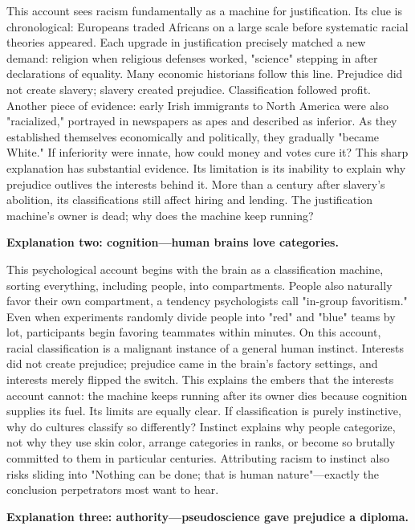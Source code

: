 This account sees racism fundamentally as a machine for justification. Its clue is chronological: Europeans traded Africans on a large scale before systematic racial theories appeared. Each upgrade in justification precisely matched a new demand: religion when religious defenses worked, "science" stepping in after declarations of equality. Many economic historians follow this line. Prejudice did not create slavery; slavery created prejudice. Classification followed profit. Another piece of evidence: early Irish immigrants to North America were also "racialized," portrayed in newspapers as apes and described as inferior. As they established themselves economically and politically, they gradually "became White." If inferiority were innate, how could money and votes cure it? This sharp explanation has substantial evidence. Its limitation is its inability to explain why prejudice outlives the interests behind it. More than a century after slavery's abolition, its classifications still affect hiring and lending. The justification machine's owner is dead; why does the machine keep running?

\textbf{Explanation two: cognition---human brains love categories.}

This psychological account begins with the brain as a classification machine, sorting everything, including people, into compartments. People also naturally favor their own compartment, a tendency psychologists call "in-group favoritism." Even when experiments randomly divide people into "red" and "blue" teams by lot, participants begin favoring teammates within minutes. On this account, racial classification is a malignant instance of a general human instinct. Interests did not create prejudice; prejudice came in the brain's factory settings, and interests merely flipped the switch. This explains the embers that the interests account cannot: the machine keeps running after its owner dies because cognition supplies its fuel. Its limits are equally clear. If classification is purely instinctive, why do cultures classify so differently? Instinct explains why people categorize, not why they use skin color, arrange categories in ranks, or become so brutally committed to them in particular centuries. Attributing racism to instinct also risks sliding into "Nothing can be done; that is human nature"---exactly the conclusion perpetrators most want to hear.

\textbf{Explanation three: authority---pseudoscience gave prejudice a diploma.}

